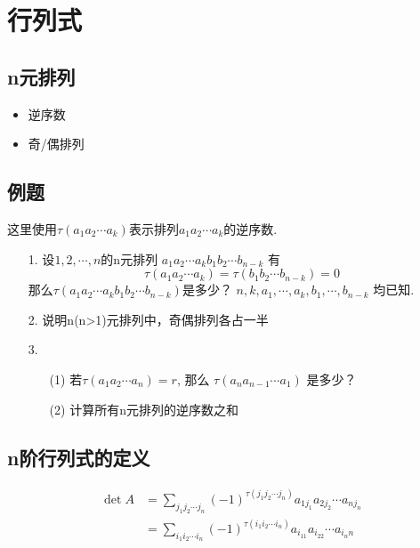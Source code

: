 \section{行列式}
\subsection{n元排列}
\begin{itemize}
    \item 逆序数
    \item 奇/偶排列
\end{itemize}

\subsection*{例题}
这里使用$\tau(a_1a_2\cdots a_k)$表示排列$a_1a_2\cdots a_k$的逆序数.
\begin{itemize}
    \item[1.] 设$1,2,\cdots,n$的n元排列
    $a_1a_2\cdots a_k b_1b_2\cdots b_{n-k}$
    有$$\tau(a_1a_2\cdots a_k) = \tau(b_1b_2\cdots b_{n-k}) = 0$$
    那么$\tau(a_1a_2\cdots a_k b_1b_2\cdots b_{n-k})$是多少？
    $n,k,a_1,\cdots,a_k, b_1, \cdots, b_{n-k}$
    均已知.
    \vspace{2.5cm}

    \item[2.] 说明n(n>1)元排列中，奇偶排列各占一半
    \vspace{1.5cm}

    \item[3.]
    \begin{itemize}
        \item[(1)] 若$\tau(a_1a_2\cdots a_n) = r$, 那么
        $\tau(a_na_{n-1}\cdots a_1)$ 是多少？
        \vspace{1.5cm}
        \item[(2)] 计算所有n元排列的逆序数之和
        \vspace{1.5cm}
    \end{itemize} 
\end{itemize}

\subsection{n阶行列式的定义}
\begin{equation}
\nonumber
\begin{aligned}
\det{A} &= \sum_{j_1 j_2\cdots j_n} (-1)^{\tau(j_1 j_2\cdots j_n)}a_{1j_1}a_{2j_2}\cdots a_{nj_n}\\
        &= \sum_{i_1 i_2\cdots i_n} (-1)^{\tau(i_1 i_2\cdots i_n)}a_{i_11}a_{i_22}\cdots a_{i_nn}
\end{aligned}
\end{equation}

